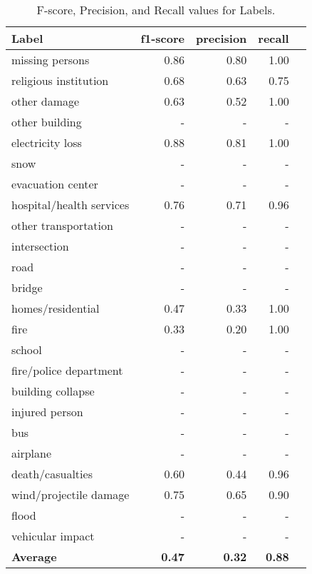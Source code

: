 \documentclass{article}
\begin{document}
\begin{table*}
\centering
\small
\begin{tabular}{|l|r|r|r| p{8cm} |}
\hline
{\bf Label}  & {\bf f1-score} & {\bf precision} & {\bf recall} \\
\hline
missing persons &  0.86  & 0.80       &  1.00 \\
religious institution          &  0.68  &    0.63    &  0.75\\
other damage        &  0.63  & 0.52   &  1.00\\
other building        &  - & -  &  -\\
electricity loss     & 0.88 & 0.81   &  1.00\\
snow        & - & - & - \\
evacuation center    &  - &  -   &  - \\
hospital/health services & 0.76 & 0.71 & 0.96 \\
other transportation & - & - & - \\
intersection & - & - & - \\
road        & - & - & - \\
bridge       & - & - &  -\\
homes/residential    & 0.47 & 0.33 &  1.00\\
fire & 0.33 & 0.20 & 1.00 \\
school & - & - & - \\
fire/police department & - & - & - \\
building collapse        & - & - & - \\
injured person & - & - & - \\
bus & -   &  -    &  -\\
airplane & -  &  -  &  -\\
death/casualties & 0.60  &  0.44  &  0.96\\
wind/projectile damage & 0.75  &  0.65   &  0.90\\
flood & -   &  -  &  -\\
vehicular impact & -   &  -    &  -\\
\hline
{\bf Average}  & {\bf 0.47} & {\bf 0.32}  & {\bf 0.88}  \\
\hline
\end{tabular}
\label{tab.by_label}
\caption{F-score, Precision, and Recall values for Labels.}
\end{table*}
\end{document}
